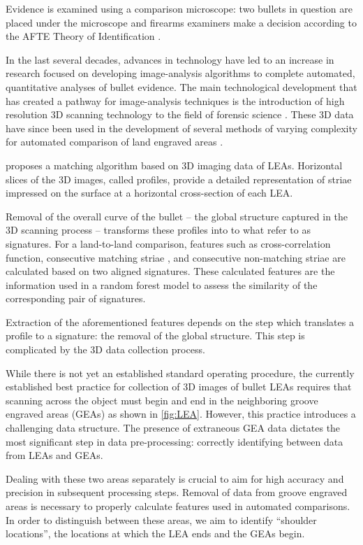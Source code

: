 \documentclass[]{article}
\begin{document}
Evidence is examined using a comparison microscope: two bullets in
question are placed under the microscope and firearms examiners make a
decision according to the AFTE Theory of Identification \citep{AFTE}.

In the last several decades, advances in technology have led to an
increase in research focused on developing image-analysis algorithms to
complete automated, quantitative analyses of bullet evidence. The main
technological development that has created a pathway for image-analysis
techniques is the introduction of high resolution 3D scanning technology
to the field of forensic science
\citep[e.g.~][]{DeKinder1, DeKinder2, Bachrach1}. These 3D data have
since been used in the development of several methods of varying
complexity for automated comparison of land engraved areas
\citep[e.g.~][]{Ma1, Chu1, Chu2, Hare1}.

\citet{Hare1} proposes a matching algorithm based on 3D imaging data of
LEAs. Horizontal slices of the 3D images, called profiles, provide a
detailed representation of striae impressed on the surface at a
horizontal cross-section of each LEA.

Removal of the overall curve of the bullet -- the global structure
captured in the 3D scanning process -- transforms these profiles into to
what \citet{Hare1} refer to as signatures. For a land-to-land
comparison, features such as cross-correlation function, consecutive
matching striae \citep[see][]{Biasotti}, and consecutive non-matching
striae are calculated based on two aligned signatures. These calculated
features are the information used in a random forest model to assess the
similarity of the corresponding pair of signatures.

Extraction of the aforementioned features depends on the step which
translates a profile to a signature: the removal of the global
structure. This step is complicated by the 3D data collection process.

While there is not yet an established standard operating procedure, the
currently established best practice for collection of 3D images of
bullet LEAs requires that scanning across the object must begin and end
in the neighboring groove engraved areas (GEAs) as shown in
\autoref{fig:LEA}. However, this practice introduces a challenging data
structure. The presence of extraneous GEA data dictates the most
significant step in data pre-processing: correctly identifying between
data from LEAs and GEAs.

Dealing with these two areas separately is crucial to aim for high
accuracy and precision in subsequent processing steps. Removal of data
from groove engraved areas is necessary to properly calculate features
used in automated comparisons. In order to distinguish between these
areas, we aim to identify ``shoulder locations'', the locations at which
the LEA ends and the GEAs begin.
\end{document}
